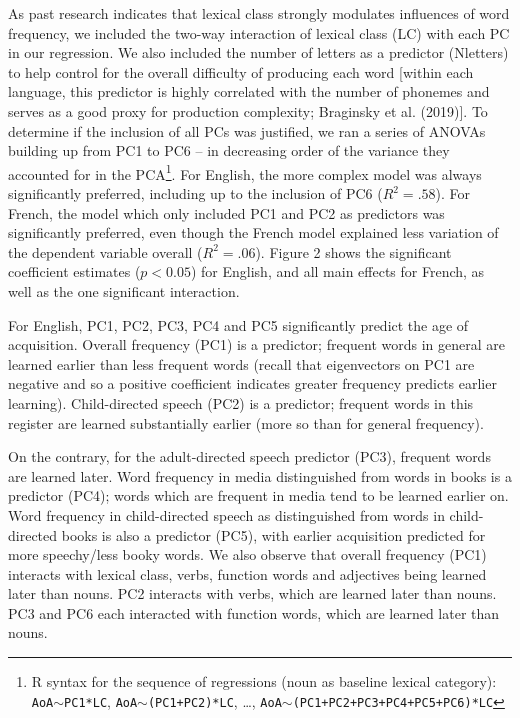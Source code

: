\documentclass[10pt, letterpaper]{article}
\begin{document}
As past research indicates that lexical class strongly modulates
influences of word frequency, we included the two-way interaction of
lexical class (LC) with each PC in our regression. We also included the
number of letters as a predictor (Nletters) to help control for the
overall difficulty of producing each word {[}within each language, this
predictor is highly correlated with the number of phonemes and serves as
a good proxy for production complexity; Braginsky et al. (2019){]}. To
determine if the inclusion of all PCs was justified, we ran a series of
ANOVAs building up from PC1 to PC6 -- in decreasing order of the
variance they accounted for in the PCA\footnote{R syntax for the
  sequence of regressions (noun as baseline lexical category):
  \texttt{AoA}\(\sim\)\texttt{PC1*LC},
  \texttt{AoA}\(\sim\)\texttt{(PC1+PC2)*LC}, \ldots,
  \texttt{AoA}\(\sim\)\texttt{(PC1+PC2+PC3+PC4+PC5+PC6)*LC}}. For
English, the more complex model was always significantly preferred,
including up to the inclusion of PC6 (\(R^2 = .58\)). For French, the
model which only included PC1 and PC2 as predictors was significantly
preferred, even though the French model explained less variation of the
dependent variable overall (\(R^2 = .06\)). Figure 2 shows the
significant coefficient estimates (\(p<0.05\)) for English, and all main
effects for French, as well as the one significant interaction.

For English, PC1, PC2, PC3, PC4 and PC5 significantly predict the age of
acquisition. Overall frequency (PC1) is a predictor; frequent words in
general are learned earlier than less frequent words (recall that
eigenvectors on PC1 are negative and so a positive coefficient indicates
greater frequency predicts earlier learning). Child-directed speech
(PC2) is a predictor; frequent words in this register are learned
substantially earlier (more so than for general frequency).

On the contrary, for the adult-directed speech predictor (PC3), frequent
words are learned later. Word frequency in media distinguished from
words in books is a predictor (PC4); words which are frequent in media
tend to be learned earlier on. Word frequency in child-directed speech
as distinguished from words in child-directed books is also a predictor
(PC5), with earlier acquisition predicted for more speechy/less booky
words. We also observe that overall frequency (PC1) interacts with
lexical class, verbs, function words and adjectives being learned later
than nouns. PC2 interacts with verbs, which are learned later than
nouns. PC3 and PC6 each interacted with function words, which are
learned later than nouns.
\end{document}
